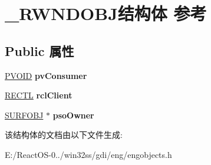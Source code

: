 \hypertarget{struct___r_w_n_d_o_b_j}{}\section{\+\_\+\+R\+W\+N\+D\+O\+B\+J结构体 参考}
\label{struct___r_w_n_d_o_b_j}
\subsection*{Public 属性}
\begin{DoxyCompactItemize}
\item 
\mbox{\label{struct___r_w_n_d_o_b_j_a997f185c051ca4ccd569585b2eb01397}} 
\hyperlink{interfacevoid}{P\+V\+O\+ID} {\bfseries pv\+Consumer}
\item 
\mbox{\label{struct___r_w_n_d_o_b_j_afaec3834e54394f957efb354fddd8495}} 
\hyperlink{struct___r_e_c_t_l}{R\+E\+C\+TL} {\bfseries rcl\+Client}
\item 
\mbox{\label{struct___r_w_n_d_o_b_j_aa886fcff9f2f3fa45b1d8594dc54b540}} 
\hyperlink{struct___s_u_r_f_o_b_j}{S\+U\+R\+F\+O\+BJ} $\ast$ {\bfseries pso\+Owner}
\end{DoxyCompactItemize}


该结构体的文档由以下文件生成\+:\begin{DoxyCompactItemize}
\item 
E\+:/\+React\+O\+S-\/0../win32ss/gdi/eng/engobjects.\+h\end{DoxyCompactItemize}
